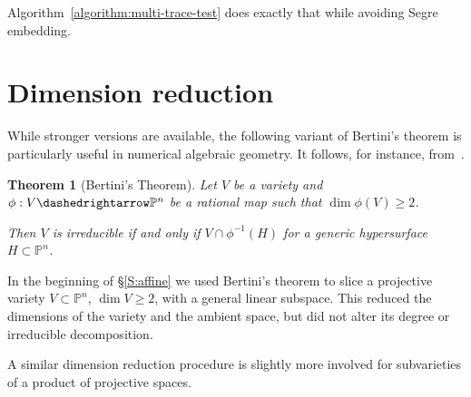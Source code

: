 \documentclass[12pt]{amsart}
\newtheorem{theorem}{Theorem}
\theoremstyle{definition}
\begin{document}
  Algorithm~\ref{algorithm:multi-trace-test} does exactly that while avoiding Segre embedding.

\section{Dimension reduction}\label{S:dimension}

While stronger versions are available, the following variant of Bertini's theorem is particularly useful in
numerical algebraic geometry.
It follows, for instance, from~\cite[Thm.~6.3~(4)]{jouanolou}.

\begin{theorem}[Bertini's Theorem]\label{thm:bertini}
Let $V$ be a variety and $\phi:V{\dashedrightarrow} {{\mathbb{P}}}^n$ be a rational map such that $\dim\phi(V) \geq 2$.

Then $V$ is irreducible if and only if $V\cap \phi^{-1}(H)$ for a generic hypersurface $H\subset{{\mathbb{P}}}^n$.
\end{theorem}

In the beginning of \S\ref{S:affine} we used Bertini's theorem to slice a projective variety $V\subset{{\mathbb{P}}}^n$, $\dim V \geq 2$, with a general linear subspace.
This reduced the dimensions of the variety and the ambient space, but did not alter its degree or irreducible decomposition.

A similar dimension reduction procedure is slightly more involved for subvarieties of a product of projective spaces.
\end{document}
